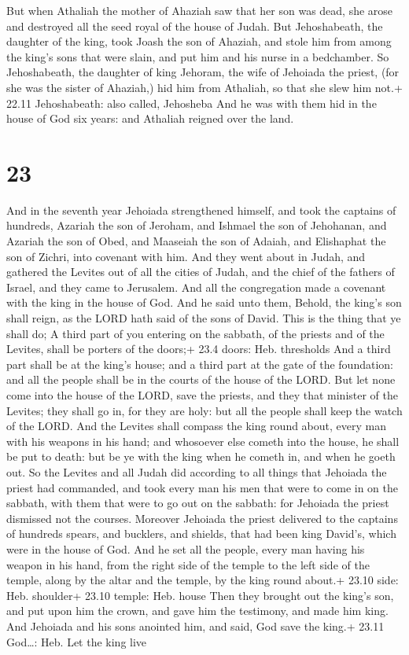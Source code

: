  But when Athaliah the mother of Ahaziah saw that her son
was dead, she arose and destroyed all the seed royal of the house of
Judah.  But Jehoshabeath, the daughter of the king, took
Joash the son of Ahaziah, and stole him from among the king's sons that
were slain, and put him and his nurse in a bedchamber. So Jehoshabeath,
the daughter of king Jehoram, the wife of Jehoiada the priest, (for she
was the sister of Ahaziah,) hid him from Athaliah, so that she slew him
not.+ 22.11 Jehoshabeath: also called, Jehosheba  And he
was with them hid in the house of God six years: and Athaliah reigned
over the land.

\hypertarget{section-22}{%
\section{23}\label{section-22}}

 And in the seventh year Jehoiada strengthened himself, and
took the captains of hundreds, Azariah the son of Jeroham, and Ishmael
the son of Jehohanan, and Azariah the son of Obed, and Maaseiah the son
of Adaiah, and Elishaphat the son of Zichri, into covenant with him.
 And they went about in Judah, and gathered the Levites out
of all the cities of Judah, and the chief of the fathers of Israel, and
they came to Jerusalem.  And all the congregation made a
covenant with the king in the house of God. And he said unto them,
Behold, the king's son shall reign, as the LORD hath said of the sons of
David.  This is the thing that ye shall do; A third part of
you entering on the sabbath, of the priests and of the Levites, shall be
porters of the doors;+ 23.4 doors: Heb. thresholds  And a
third part shall be at the king's house; and a third part at the gate of
the foundation: and all the people shall be in the courts of the house
of the LORD.  But let none come into the house of the LORD,
save the priests, and they that minister of the Levites; they shall go
in, for they are holy: but all the people shall keep the watch of the
LORD.  And the Levites shall compass the king round about,
every man with his weapons in his hand; and whosoever else cometh into
the house, he shall be put to death: but be ye with the king when he
cometh in, and when he goeth out.  So the Levites and all
Judah did according to all things that Jehoiada the priest had
commanded, and took every man his men that were to come in on the
sabbath, with them that were to go out on the sabbath: for Jehoiada the
priest dismissed not the courses.  Moreover Jehoiada the
priest delivered to the captains of hundreds spears, and bucklers, and
shields, that had been king David's, which were in the house of God.
 And he set all the people, every man having his weapon in
his hand, from the right side of the temple to the left side of the
temple, along by the altar and the temple, by the king round about.+
23.10 side: Heb. shoulder+ 23.10 temple: Heb. house  Then
they brought out the king's son, and put upon him the crown, and gave
him the testimony, and made him king. And Jehoiada and his sons anointed
him, and said, God save the king.+ 23.11 God\ldots: Heb. Let the king
live


